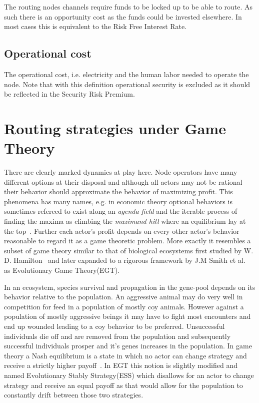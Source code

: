 The routing nodes channels require funds to be locked up to be able to route. As such there is an opportunity cost as the funds could be invested elsewhere. In most cases this is equivalent to the Risk Free Interest Rate.

\subsection{Operational cost}

The operational cost, i.e. electricity and the human labor needed to operate the \gls{node}. Note that with this definition operational security is excluded as it should be reflected in the Security Risk Premium.  

\section{Routing strategies under Game Theory}

There are clearly marked dynamics at play here. Node operators have many different options at their disposal and although all actors may not be rational their behavior should approximate the behavior of maximizing profit. This phenomena has many names, e.g. in economic theory optional behaviors is sometimes refereed to exist along an \textit{agenda field} and the iterable process of finding the maxima as climbing the \textit{maximand hill} where an equilibrium lay at the top~\cite{boulding:evolutionary:economy}. Further each actor's profit depends on every other actor's behavior reasonable to regard it as a game theoretic problem. More exactly it resembles a subset of game theory similar to that of biological ecosystems first studied by W. D. Hamilton~\cite{hamilton:behavior} and later expanded to a rigorous framework by J.M Smith et al.~\cite{smith:price:logic:animal, smith:evolution:games} as Evolutionary Game Theory(EGT).

In an ecosystem, species survival and propagation in the gene-pool depends on its behavior relative to the population. An aggressive animal may do very well in competition for feed in a population of mostly coy animals. However against a population of mostly aggressive beings it may have to fight most encounters and end up wounded leading to a coy behavior to be preferred. Unsuccessful individuals die off and are removed from the population and subsequently successful individuals prosper and it's genes increases in the population. In game theory a Nash equilibrium is a state in which no actor can change strategy and receive a strictly higher payoff~\cite{nash:equilibrium}. In EGT this notion is slightly modified and named Evolutionary Stably Strategy(ESS) which disallows for an actor to change strategy and receive an equal payoff as that would allow for the population to constantly drift between those two strategies. 

